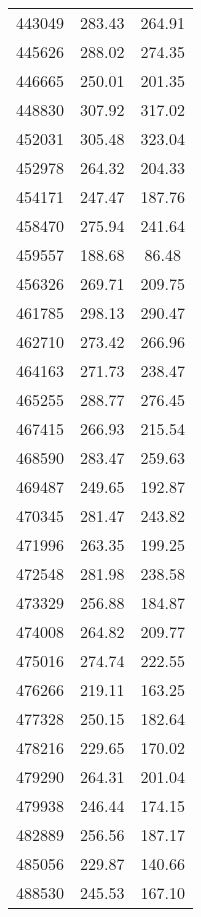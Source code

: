 \documentclass[main.tex]{subfiles}
\begin{document}
\begin{longtable}{ccc}
		443049     & 283.43       & 264.91       \\
		445626     & 288.02       & 274.35       \\
		446665     & 250.01       & 201.35       \\
		448830     & 307.92       & 317.02       \\
		452031     & 305.48       & 323.04       \\
		452978     & 264.32       & 204.33       \\
		454171     & 247.47       & 187.76       \\
		458470     & 275.94       & 241.64       \\
		459557     & 188.68       & 86.48        \\
		456326     & 269.71       & 209.75       \\
		461785     & 298.13       & 290.47       \\
		462710     & 273.42       & 266.96       \\
		464163     & 271.73       & 238.47       \\
		465255     & 288.77       & 276.45       \\
		467415     & 266.93       & 215.54       \\
		468590     & 283.47       & 259.63       \\
		469487     & 249.65       & 192.87       \\
		470345     & 281.47       & 243.82       \\
		471996     & 263.35       & 199.25       \\
		472548     & 281.98       & 238.58       \\
		473329     & 256.88       & 184.87       \\
		474008     & 264.82       & 209.77       \\
		475016     & 274.74       & 222.55       \\
		476266     & 219.11       & 163.25       \\
		477328     & 250.15       & 182.64       \\
		478216     & 229.65       & 170.02       \\
		479290     & 264.31       & 201.04       \\
		479938     & 246.44       & 174.15       \\
		482889     & 256.56       & 187.17       \\
		485056     & 229.87       & 140.66       \\
		488530     & 245.53       & 167.10       \\

\end{longtable}
\end{document}
